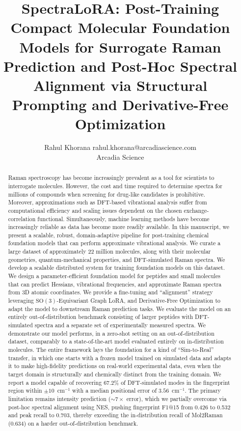\documentclass[10pt]{article}
\title{SpectraLoRA: Post-Training Compact Molecular Foundation Models for  Surrogate Raman Prediction and Post-Hoc Spectral Alignment via Structural Prompting and Derivative-Free Optimization}
\author{\name Rahul Khorana \email rahul.khorana@arcadiascience.com \\
\addr Arcadia Science}
\begin{document}
\maketitle

\begin{abstract}
Raman spectroscopy has become increasingly prevalent as a tool for scientists to interrogate molecules. However, the cost and time required to determine spectra for millions of compounds when screening for drug-like candidates is prohibitive. Moreover, approximations such as DFT-based vibrational analysis suffer from computational efficiency and scaling issues dependent on the chosen exchange-correlation functional. Simultaneously, machine learning methods have become increasingly reliable as data has become more readily available. In this manuscript, we present a scalable, robust, domain-adaptive pipeline for post-training chemical foundation models that can perform approximate vibrational analysis. We curate a large dataset of approximately 22 million molecules, along with their molecular geometries, quantum-mechanical properties, and DFT-simulated Raman spectra. We develop a scalable distributed system for training foundation models on this dataset. We design a parameter-efficient foundation model for peptides and small molecules that can predict Hessians, vibrational frequencies, and approximate Raman spectra from 3D atomic coordinates. We provide a fine-tuning and ``alignment'' strategy leveraging $\mathrm{SO}(3)$-Equivariant Graph LoRA, and Derivative-Free Optimization to adapt the model to downstream Raman prediction tasks. We evaluate the model on an entirely out-of-distribution benchmark consisting of larger peptides with DFT-simulated spectra and a separate set of experimentally measured spectra. We demonstrate our model performs, in a zero-shot setting on an out-of-distribution dataset, comparably to a state-of-the-art model evaluated entirely on in-distribution molecules. The entire framework lays the foundation for a kind of ``Sim-to-Real'' transfer, in which one starts with a frozen model trained on simulated data and adapts it to make high-fidelity predictions on real-world experimental data, even when the target domain is structurally and chemically distinct from the training domain.
We report a model capable of recovering $67.2\%$ of DFT-simulated modes in the fingerprint region within $\pm 10$~cm$^{-1}$ with a median positional error of $3.56$~cm$^{-1}$. The primary limitation remains intensity prediction (${\sim}7\times$ error), which we partially overcome via post-hoc spectral alignment using NES, pushing fingerprint F1@15 from 0.426 to 0.532 and peak recall to 0.703, thereby exceeding the in-distribution recall of Mol2Raman (0.634) on a harder out-of-distribution benchmark.
\end{abstract}
\end{document}

